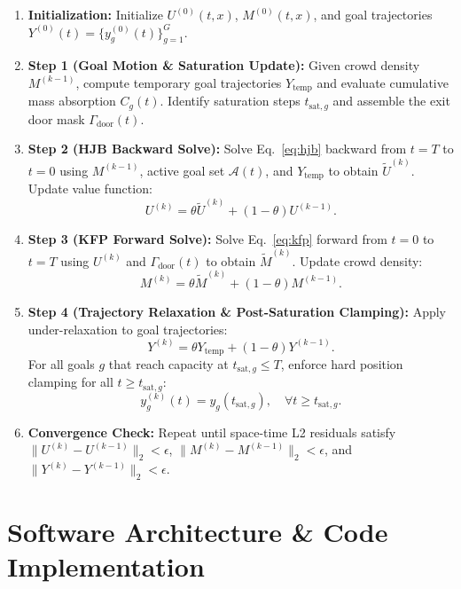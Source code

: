 \documentclass[11pt,a4paper]{article}
\begin{document}
\begin{enumerate}
    \item \textbf{Initialization:} Initialize $U^{(0)}(t, x)$, $M^{(0)}(t, x)$, and goal trajectories $Y^{(0)}(t) = \{y_g^{(0)}(t)\}_{g=1}^G$.
    \item \textbf{Step 1 (Goal Motion \& Saturation Update):} Given crowd density $M^{(k-1)}$, compute temporary goal trajectories $Y_{\text{temp}}$ and evaluate cumulative mass absorption $C_g(t)$. Identify saturation steps $t_{\text{sat}, g}$ and assemble the exit door mask $\Gamma_{\text{door}}(t)$.
    \item \textbf{Step 2 (HJB Backward Solve):} Solve Eq.~\eqref{eq:hjb} backward from $t = T$ to $t = 0$ using $M^{(k-1)}$, active goal set $\mathcal{A}(t)$, and $Y_{\text{temp}}$ to obtain $\tilde{U}^{(k)}$. Update value function:
    \begin{equation}
    U^{(k)} = \theta \tilde{U}^{(k)} + (1-\theta) U^{(k-1)}.
    \end{equation}
    \item \textbf{Step 3 (KFP Forward Solve):} Solve Eq.~\eqref{eq:kfp} forward from $t = 0$ to $t = T$ using $U^{(k)}$ and $\Gamma_{\text{door}}(t)$ to obtain $\tilde{M}^{(k)}$. Update crowd density:
    \begin{equation}
    M^{(k)} = \theta \tilde{M}^{(k)} + (1-\theta) M^{(k-1)}.
    \end{equation}
    \item \textbf{Step 4 (Trajectory Relaxation \& Post-Saturation Clamping):} Apply under-relaxation to goal trajectories:
    \begin{equation}
    Y^{(k)} = \theta Y_{\text{temp}} + (1-\theta) Y^{(k-1)}.
    \end{equation}
    For all goals $g$ that reach capacity at $t_{\text{sat}, g} \le T$, enforce hard position clamping for all $t \ge t_{\text{sat}, g}$:
    \begin{equation}
    y_g^{(k)}(t) = y_g(t_{\text{sat}, g}), \quad \forall t \ge t_{\text{sat}, g}.
    \end{equation}
    \item \textbf{Convergence Check:} Repeat until space-time L2 residuals satisfy $\|U^{(k)} - U^{(k-1)}\|_2 < \epsilon$, $\|M^{(k)} - M^{(k-1)}\|_2 < \epsilon$, and $\|Y^{(k)} - Y^{(k-1)}\|_2 < \epsilon$.
\end{enumerate}

\section{Software Architecture \& Code Implementation}
\end{document}
